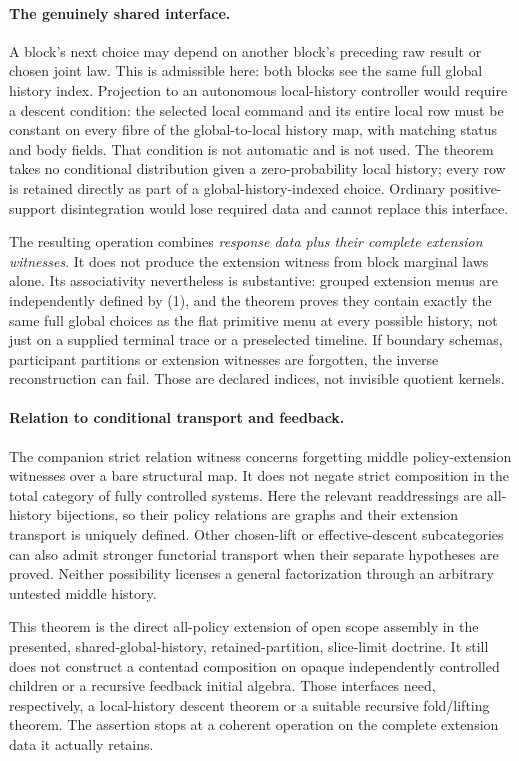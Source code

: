 \documentclass[11pt]{article}
\begin{document}
\paragraph{The genuinely shared interface.}
A block's next choice may depend on another block's preceding raw result or chosen joint law. This is admissible here: both blocks see the same full global history index. Projection to an autonomous local-history controller would require a descent condition: the selected local command and its entire local row must be constant on every fibre of the global-to-local history map, with matching status and body fields. That condition is not automatic and is not used. The theorem takes no conditional distribution given a zero-probability local history; every row is retained directly as part of a global-history-indexed choice. Ordinary positive-support disintegration would lose required data and cannot replace this interface.

The resulting operation combines \emph{response data plus their complete extension witnesses}. It does not produce the extension witness from block marginal laws alone. Its associativity nevertheless is substantive: grouped extension menus are independently defined by (1), and the theorem proves they contain exactly the same full global choices as the flat primitive menu at every possible history, not just on a supplied terminal trace or a preselected timeline. If boundary schemas, participant partitions or extension witnesses are forgotten, the inverse reconstruction can fail. Those are declared indices, not invisible quotient kernels.

\paragraph{Relation to conditional transport and feedback.}
The companion strict relation witness concerns forgetting middle policy-extension witnesses over a bare structural map. It does not negate strict composition in the total category of fully controlled systems. Here the relevant readdressings are all-history bijections, so their policy relations are graphs and their extension transport is uniquely defined. Other chosen-lift or effective-descent subcategories can also admit stronger functorial transport when their separate hypotheses are proved. Neither possibility licenses a general factorization through an arbitrary untested middle history.

This theorem is the direct all-policy extension of open scope assembly in the presented, shared-global-history, retained-partition, slice-limit doctrine. It still does not construct a contentad composition on opaque independently controlled children or a recursive feedback initial algebra. Those interfaces need, respectively, a local-history descent theorem or a suitable recursive fold/lifting theorem. The assertion stops at a coherent operation on the complete extension data it actually retains.
\end{document}

